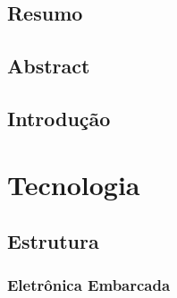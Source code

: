 \section{Resumo} %


\section{Abstract} %


\section{Introdução} %


\chapter{Tecnologia}

\section{Estrutura} %


\subsection{Eletrônica Embarcada} %


